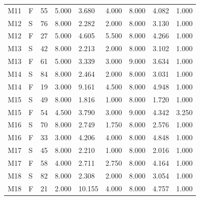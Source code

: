 {\begin{longtable}{lllllllll}
M11 & F & 55 & 5.000 & 3.680 & 4.000 & 8.000 & 4.082 & 1.000 \\
M12 & S & 76 & 8.000 & 2.282 & 2.000 & 8.000 & 3.130 & 1.000 \\
M12 & F & 27 & 5.000 & 4.605 & 5.500 & 8.000 & 4.266 & 1.000 \\
M13 & S & 42 & 8.000 & 2.213 & 2.000 & 8.000 & 3.102 & 1.000 \\
M13 & F & 61 & 5.000 & 3.339 & 3.000 & 9.000 & 3.634 & 1.000 \\
M14 & S & 84 & 8.000 & 2.464 & 2.000 & 8.000 & 3.031 & 1.000 \\
M14 & F & 19 & 3.000 & 9.161 & 4.500 & 8.000 & 4.948 & 1.000 \\
M15 & S & 49 & 8.000 & 1.816 & 1.000 & 8.000 & 1.720 & 1.000 \\
M15 & F & 54 & 4.500 & 3.790 & 3.000 & 9.000 & 4.342 & 3.250 \\
M16 & S & 70 & 8.000 & 2.749 & 1.750 & 8.000 & 2.576 & 1.000 \\
M16 & F & 33 & 3.000 & 4.206 & 4.000 & 8.000 & 4.848 & 1.000 \\
M17 & S & 45 & 8.000 & 2.210 & 1.000 & 8.000 & 2.016 & 1.000 \\
M17 & F & 58 & 4.000 & 2.711 & 2.750 & 8.000 & 4.164 & 1.000 \\
M18 & S & 82 & 8.000 & 2.308 & 2.000 & 8.000 & 3.054 & 1.000 \\
M18 & F & 21 & 2.000 & 10.155 & 4.000 & 8.000 & 4.757 & 1.000 \\
\end{longtable}}

